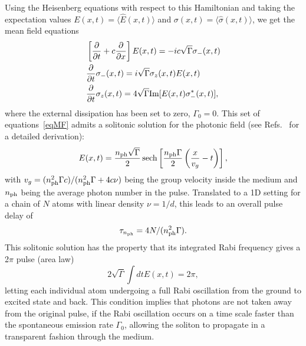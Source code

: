 \documentclass[pra,twocolumn,showpacs,preprintnumbers,amsmath,amssymb]{revtex4-1}
\begin{document}
Using the Heisenberg equations with respect to this Hamiltonian and taking the expectation values $E(x,t)=\langle \hat E(x,t)\rangle$ and $\sigma(x,t)=\langle \hat \sigma(x,t)\rangle$, we get the mean field equations
\begin{equation}\label{eqMF}
\begin{split}
&\left[\frac{\partial}{\partial t}+c \frac{\partial}{\partial x}\right ]E(x,t)=-ic\sqrt{\Gamma}\sigma_-(x,t)\\
&\frac{\partial}{\partial t}\sigma_-(x,t)=i\sqrt{\Gamma}\sigma_z(x,t)E(x,t)\\
&\frac{\partial}{\partial t}\sigma_z(x,t)=4\sqrt{\Gamma }{\rm Im}[E(x,t)\sigma^*_-(x,t)],
\end{split}
\end{equation}
where  the external dissipation has been set to zero, $\Gamma_0=0$.
This set of equations~\eqref{eqMF} admits a solitonic solution for the photonic field (see Refs.~\cite{Bullough,mahmo_calajo} for a detailed derivation):
 \begin{equation}\label{eqSIT_solution}
  E(x,t)=\frac{ n_{\rm ph}\sqrt{\Gamma}}{2}\operatorname{sech}\left[\frac{ n_{\rm ph}\Gamma}{2}\left(\frac{x}{v_g}-t\right)\right],
 \end{equation}
with $v_g=(n^2_{\rm ph}\Gamma c)/(n^2_{\rm ph}\Gamma+4c\nu)$ being the group velocity inside the medium and $n_{\rm ph}$ being the average photon number in the pulse. Translated to a 1D   setting for a chain of $N$ atoms with linear density $\nu=1/d$, this leads to an overall pulse delay of~\cite{mahmo_calajo}
\begin{equation}\label{delaySIT}
\tau_{n_{\rm ph}}=4N/( n^2_{\rm ph}\Gamma).
\end{equation}
This solitonic solution has the property that its integrated Rabi frequency gives a 2$\pi$ pulse (area law)~\cite{McCall1,McCall2,Bullough,mahmo_calajo}
 \begin{equation}\label{eqSITarea}
2 \sqrt{\Gamma}\int dt E(x,t) = 2\pi,
 \end{equation}
letting each individual atom undergoing a full Rabi oscillation from the ground to excited state and back. This condition implies that photons are not taken away
from the original pulse, if the Rabi oscillation occurs on a time scale faster than the spontaneous emission rate $\Gamma_0$, allowing the soliton to propagate in a transparent fashion through the medium.%
\end{document}
